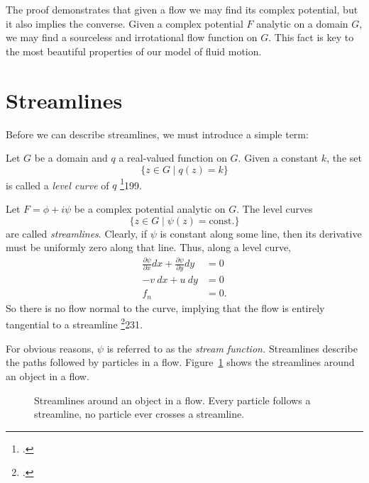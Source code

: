 \documentclass[letterpaper, twoside, 12 pt]{article}
\begin{document}
	\begin{remark}
		The proof demonstrates that given a flow we may find its complex potential, but it also implies the converse.
		Given a complex potential $F$ analytic on a domain $G$, we may find a sourceless and irrotational flow function on $G$.
		This fact is key to the most beautiful properties of our model of fluid motion.
	\end{remark}



\section{Streamlines} %
\label{sec:streamlines}

	Before we can describe streamlines, we must introduce a simple term:\
	\begin{definition}
		Let $G$ be a domain and $q$ a real-valued function on $G$.
		Given a constant $k$, the set 
		\[
			\{ z \in G \mid q(z) = k \}
		\]
		is called a \textit{level curve} of $q$ \footcite{fisher}{199}.
	\end{definition}

	\begin{definition}[Streamlines]
		Let $F = \phi + i \psi$ be a complex potential analytic on $G$.
		The level curves
		\[
			\{ z \in G \mid \psi(z) = \mathrm{const.} \}
		\]
		are called \textit{streamlines}.
		Clearly, if $\psi$ is constant along some line, then its derivative must be uniformly zero along that line.
		Thus, along a level curve,
		\begin{align*}
			\frac{\partial \psi}{\partial x}dx + \frac{\partial \psi}{\partial y}dy &= 0 \\
			-v\> dx  + u\> dy &= 0 \\
			f_n &= 0.
		\end{align*}
		So there is no flow normal to the curve, implying that the flow is entirely tangential to a streamline \footcite{silverman}{231}.
	\end{definition}
	\begin{remark}
		For obvious reasons, $\psi$ is referred to as the \textit{stream function.}
		Streamlines describe the paths followed by particles in a flow. 
		Figure~\ref{fig:streamlines} shows the streamlines around an object in a flow.
	\end{remark}

	\begin{figure}[H]
		\centering
		\begin{tikzpicture}
			
		\end{tikzpicture}
		\captionsetup{width = 0.5 \textwidth}
		\caption{
			Streamlines around an object in a flow.
			Every particle follows a streamline, no particle ever crosses a streamline.
		}
		\label{fig:streamlines}
	\end{figure}
\end{document}
